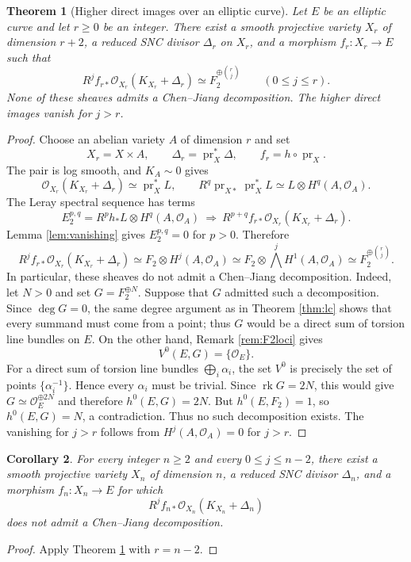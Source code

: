 \documentclass[10pt,a4paper]{amsart}
\newtheorem{theorem}{Theorem}[section]
\newtheorem{corollary}[theorem]{Corollary}
\newcommand{\OO}{\mathcal O}
\DeclareMathOperator{\pr}{pr}
\DeclareMathOperator{\rk}{rk}
\begin{document}
\begin{theorem}[Higher direct images over an elliptic curve]\label{thm:higher}
Let $E$ be an elliptic curve and let $r\ge0$ be an integer. There exist a smooth projective variety $X_r$ of dimension $r+2$, a reduced SNC divisor $\Delta_r$ on $X_r$, and a morphism $f_r:X_r\to E$ such that
\[
R^jf_{r*}\OO_{X_r}(K_{X_r}+\Delta_r)\simeq F_2^{\oplus\binom rj}\qquad(0\le j\le r).
\]
None of these sheaves admits a Chen--Jiang decomposition. The higher direct images vanish for $j>r$.
\end{theorem}
\begin{proof}
Choose an abelian variety $A$ of dimension $r$ and set
\[
X_r=X\times A,\qquad\Delta_r=\pr_X^*\Delta,\qquad f_r=h\circ\pr_X.
\]
The pair is log smooth, and $K_A\sim0$ gives
\[
\OO_{X_r}(K_{X_r}+\Delta_r)\simeq\pr_X^*L,\qquad
R^q\pr_{X*}\pr_X^*L\simeq L\otimes H^q(A,\OO_A).
\]
The Leray spectral sequence has terms
\[
E_2^{p,q}=R^ph_*L\otimes H^q(A,\OO_A)
\ \Longrightarrow\ R^{p+q}f_{r*}\OO_{X_r}(K_{X_r}+\Delta_r).
\]
Lemma \ref{lem:vanishing} gives $E_2^{p,q}=0$ for $p>0$. Therefore
\[
R^jf_{r*}\OO_{X_r}(K_{X_r}+\Delta_r)
\simeq F_2\otimes H^j(A,\OO_A)
\simeq F_2\otimes\bigwedge^jH^1(A,\OO_A)
\simeq F_2^{\oplus\binom rj}.
\]
In particular, these sheaves do not admit a Chen--Jiang decomposition. Indeed, let $N>0$ and set $G=F_2^{\oplus N}$. Suppose that $G$ admitted such a decomposition. Since $\deg G=0$, the same degree argument as in Theorem \ref{thm:lc} shows that every summand must come from a point; thus $G$ would be a direct sum of torsion line bundles on $E$. On the other hand, Remark \ref{rem:F2loci} gives
\[
V^0(E,G)=\{\OO_E\}.
\]
For a direct sum of torsion line bundles $\bigoplus_i\alpha_i$, the set $V^0$ is precisely the set of points $\{\alpha_i^{-1}\}$. Hence every $\alpha_i$ must be trivial. Since $\rk G=2N$, this would give $G\simeq\OO_E^{\oplus2N}$ and therefore $h^0(E,G)=2N$. But $h^0(E,F_2)=1$, so $h^0(E,G)=N$, a contradiction. Thus no such decomposition exists. The vanishing for $j>r$ follows from $H^j(A,\OO_A)=0$ for $j>r$.
\end{proof}

\begin{corollary}
For every integer $n\ge2$ and every $0\le j\le n-2$, there exist a smooth projective variety $X_n$ of dimension $n$, a reduced SNC divisor $\Delta_n$, and a morphism $f_n:X_n\to E$ for which
\[
R^jf_{n*}\OO_{X_n}(K_{X_n}+\Delta_n)
\]
does not admit a Chen--Jiang decomposition.
\end{corollary}
\begin{proof}
Apply Theorem \ref{thm:higher} with $r=n-2$.
\end{proof}
\end{document}

